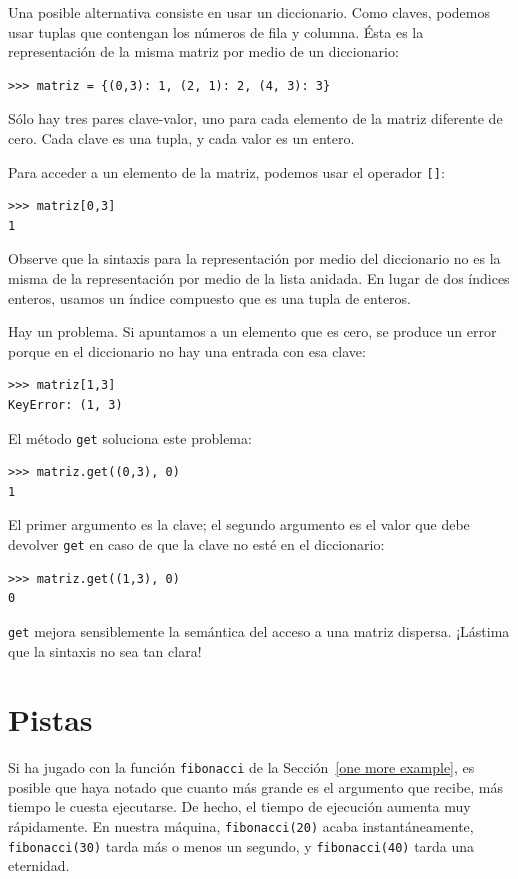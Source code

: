 Una posible alternativa consiste en usar un diccionario. Como claves,
podemos usar tuplas que contengan los números de fila y columna. Ésta
es la representación de la misma matriz por medio de un diccionario:
\begin{verbatim}
>>> matriz = {(0,3): 1, (2, 1): 2, (4, 3): 3}
\end{verbatim}

Sólo hay tres pares clave-valor, uno para cada elemento de la matriz
diferente de cero. Cada clave es una tupla, y cada valor es un entero.

Para acceder a un elemento de la matriz, podemos usar el operador
\texttt{{[}{]}}:
\begin{verbatim}
>>> matriz[0,3]
1
\end{verbatim}

Observe que la sintaxis para la representación por medio del diccionario
no es la misma de la representación por medio de la lista anidada.
En lugar de dos índices enteros, usamos un índice compuesto que es
una tupla de enteros.

Hay un problema. Si apuntamos a un elemento que es cero, se produce
un error porque en el diccionario no hay una entrada con esa clave:

\begin{verbatim}
>>> matriz[1,3]
KeyError: (1, 3)
\end{verbatim}

El método \texttt{get} soluciona este problema:
\begin{verbatim}
>>> matriz.get((0,3), 0)
1
\end{verbatim}

El primer argumento es la clave; el segundo argumento es el valor
que debe devolver \texttt{get} en caso de que la clave no esté en
el diccionario:
\begin{verbatim}
>>> matriz.get((1,3), 0)
0
\end{verbatim}

\texttt{get} mejora sensiblemente la semántica del acceso a una matriz
dispersa. ¡Lástima que la sintaxis no sea tan clara!

\section{Pistas}

 

Si ha jugado con la función \texttt{fibonacci} de la Sección~\ref{one more example},
es posible que haya notado que cuanto más grande es el argumento que
recibe, más tiempo le cuesta ejecutarse. De hecho, el tiempo de ejecución
aumenta muy rápidamente. En nuestra máquina, \texttt{fibonacci(20)}
acaba instantáneamente, \texttt{fibonacci(30)} tarda más o menos un
segundo, y \texttt{fibonacci(40)} tarda una eternidad.


